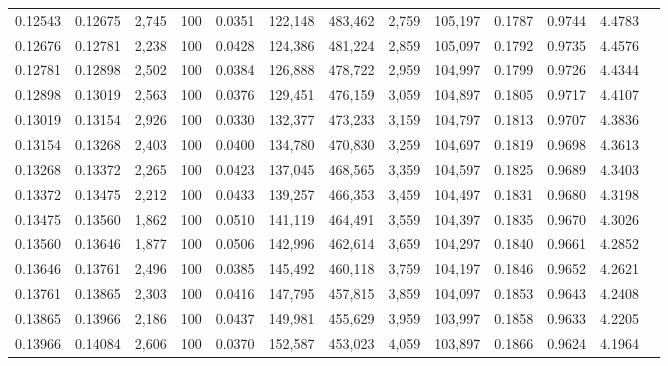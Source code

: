 \begin{tabular}{rrrrrrrrrrrrr}
0.12543 & 0.12675 & 2,745 & 100 &                                     0.0351 & 122,148 & 483,462 &   2,759 & 105,197 & 0.1787 & 0.9744 & 4.4783 \\
0.12676 & 0.12781 & 2,238 & 100 &                                     0.0428 & 124,386 & 481,224 &   2,859 & 105,097 & 0.1792 & 0.9735 & 4.4576 \\
0.12781 & 0.12898 & 2,502 & 100 &                                     0.0384 & 126,888 & 478,722 &   2,959 & 104,997 & 0.1799 & 0.9726 & 4.4344 \\
0.12898 & 0.13019 & 2,563 & 100 &                                     0.0376 & 129,451 & 476,159 &   3,059 & 104,897 & 0.1805 & 0.9717 & 4.4107 \\
0.13019 & 0.13154 & 2,926 & 100 &                                     0.0330 & 132,377 & 473,233 &   3,159 & 104,797 & 0.1813 & 0.9707 & 4.3836 \\
0.13154 & 0.13268 & 2,403 & 100 &                                     0.0400 & 134,780 & 470,830 &   3,259 & 104,697 & 0.1819 & 0.9698 & 4.3613 \\
0.13268 & 0.13372 & 2,265 & 100 &                                     0.0423 & 137,045 & 468,565 &   3,359 & 104,597 & 0.1825 & 0.9689 & 4.3403 \\
0.13372 & 0.13475 & 2,212 & 100 &                                     0.0433 & 139,257 & 466,353 &   3,459 & 104,497 & 0.1831 & 0.9680 & 4.3198 \\
0.13475 & 0.13560 & 1,862 & 100 &                                     0.0510 & 141,119 & 464,491 &   3,559 & 104,397 & 0.1835 & 0.9670 & 4.3026 \\
0.13560 & 0.13646 & 1,877 & 100 &                                     0.0506 & 142,996 & 462,614 &   3,659 & 104,297 & 0.1840 & 0.9661 & 4.2852 \\
0.13646 & 0.13761 & 2,496 & 100 &                                     0.0385 & 145,492 & 460,118 &   3,759 & 104,197 & 0.1846 & 0.9652 & 4.2621 \\
0.13761 & 0.13865 & 2,303 & 100 &                                     0.0416 & 147,795 & 457,815 &   3,859 & 104,097 & 0.1853 & 0.9643 & 4.2408 \\
0.13865 & 0.13966 & 2,186 & 100 &                                     0.0437 & 149,981 & 455,629 &   3,959 & 103,997 & 0.1858 & 0.9633 & 4.2205 \\
0.13966 & 0.14084 & 2,606 & 100 &                                     0.0370 & 152,587 & 453,023 &   4,059 & 103,897 & 0.1866 & 0.9624 & 4.1964 \\

\end{tabular}
